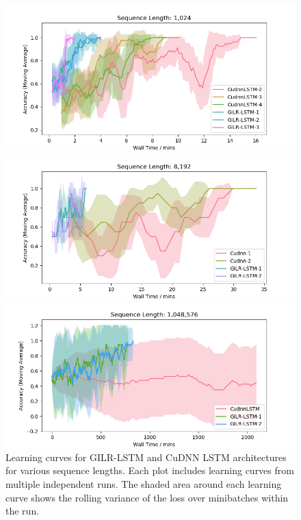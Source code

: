 \documentclass{article}
\begin{document}
\begin{figure}
  \centering
  \begin{minipage}{0.5\textwidth}
    \includegraphics[width=1.0\textwidth]{./1k_synthetic_new.png}
  \end{minipage}%
    \begin{minipage}{0.5\textwidth}
    \includegraphics[width=1.0\textwidth]{./8k_synthetic_new.png}
  \end{minipage}
  \begin{minipage}{0.5\textwidth}
    \includegraphics[width=1.0\textwidth]{./1m_synthetic_new.png}
  \end{minipage}
  \caption{Learning curves for GILR-LSTM and CuDNN LSTM architectures for various
    sequence lengths. Each plot includes learning curves from multiple independent
    runs. The shaded area around each learning curve shows the rolling variance
    of the loss over minibatches within the run.
}
    \label{fig:synthetic_training}
  \end{figure}
\end{document}
